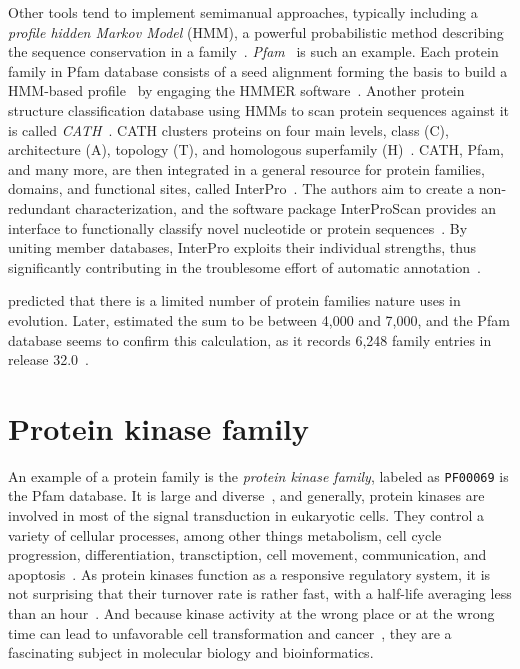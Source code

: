   Other tools tend to implement semimanual approaches, typically including a
  \emph{profile hidden Markov Model} (HMM), a powerful probabilistic method describing the
  sequence conservation in a family~\cite{krogh1994hidden, eddy1996hidden}.
  \emph{Pfam}~\cite{sonnhammer1997pfam} is such an example.
  Each protein family in Pfam database consists of a seed alignment forming the basis to
  build a HMM-based profile~\cite{el2019pfam} by engaging the HMMER
  software~\cite{finn2010pfam, finn2011hmmer}.
  Another protein structure classification database using HMMs to scan protein sequences
  against it is called \emph{CATH}~\cite{dawson2017cath}.
  CATH clusters proteins on four main levels, class (C), architecture (A), topology (T),
  and homologous superfamily (H)~\cite{orengo1997cath}.
  CATH, Pfam, and many more, are then integrated in a general resource for protein
  families, domains, and functional sites, called InterPro~\cite{finn2017interpro}.
  The authors aim to create a non-redundant characterization, and the software package
  InterProScan provides an interface to functionally classify novel nucleotide or protein
  sequences~\cite{zdobnov2001interproscan}.
  By uniting member databases, InterPro exploits their individual strengths, thus
  significantly contributing in the troublesome effort of automatic
  annotation~\cite{apweiler2000interpro}.

  \citet{chothia1992one} predicted that there is a limited number of protein families
  nature uses in evolution.
  Later, \citet{wolf2000estimating} estimated the sum to be between 4,000 and 7,000, and
  the Pfam database seems to confirm this calculation, as it records 6,248 family entries
  in release 32.0~\cite{el2019pfam}.

\section*{Protein kinase family}
\label{intro:pkinase}

  An example of a protein family is the \emph{protein kinase family}, labeled as
  \texttt{PF00069} is the Pfam database.
  It is large and diverse~\cite{hanks1988protein, hunter19911}, and generally, protein
  kinases are involved in most of the signal transduction in eukaryotic cells.
  They control a variety of cellular processes, among other things metabolism, cell cycle
  progression, differentiation, transctiption, cell movement, communication, and
  apoptosis~\cite{kemp2003amp, matsuoka1998linkage, johnson1994sequential,
  vermeulen2003transcriptional, chen1994cell, warn1998regulation, cross2000serine}.
  As protein kinases function as a responsive regulatory system, it is not surprising that
  their turnover rate is rather fast, with a half-life averaging less than an
  hour~\cite{hunter1982phosphotyrosine}.
  And because kinase activity at the wrong place or at the wrong time can lead to
  unfavorable cell transformation and cancer~\cite{koivunen2006protein,
  caretta2011protein}, they are a fascinating subject in molecular biology and
  bioinformatics.

